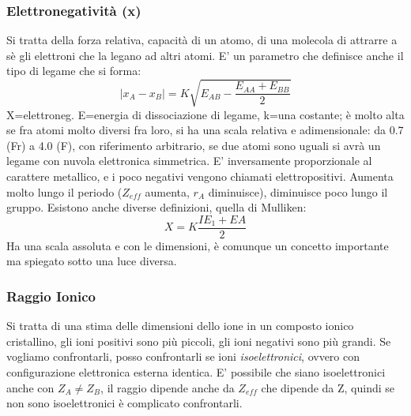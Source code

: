 \subsubsection{Elettronegatività (x)}
Si tratta della forza relativa, capacità di un atomo, di una molecola di attrarre a sè gli elettroni che la legano ad altri atomi. E' un parametro che definisce anche il tipo di legame che si forma: \[|x_A-x_B| = K\sqrt{E_{AB}-\frac{E_{AA}+E_{BB}}{2}}\]
X=elettroneg. E=energia di dissociazione di legame, k=una costante; è molto alta se fra atomi molto diversi fra loro, si ha una scala relativa e adimensionale: da 0.7 (Fr) a 4.0 (F), con riferimento arbitrario, se due atomi sono uguali si avrà un legame con nuvola elettronica simmetrica. E' inversamente proporzionale al carattere metallico, e i poco negativi vengono chiamati elettropositivi. Aumenta molto lungo il periodo ($Z_{eff}$ aumenta, $r_A$ diminuisce), diminuisce poco lungo il gruppo. 
Esistono anche diverse definizioni, quella di Mulliken: \[X=K\frac{IE_1+EA}{2}\]
Ha una scala assoluta e con le dimensioni, è comunque un concetto importante ma spiegato sotto una luce diversa.

\subsubsection{Raggio Ionico}
Si tratta di una stima delle dimensioni dello ione in un composto ionico cristallino, gli ioni positivi sono più piccoli, gli ioni negativi sono più grandi. Se vogliamo confrontarli, posso confrontarli se ioni \emph{isoelettronici}, ovvero con configurazione elettronica esterna identica. E' possibile che siano isoelettronici anche con $Z_{A} \neq Z_{B}$, il raggio dipende anche da $Z_{eff}$ che dipende da Z, quindi se non sono isoelettronici  è complicato confrontarli. 



